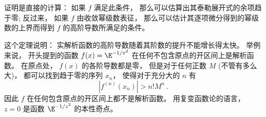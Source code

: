 证明是直接的计算： 如果 $f$ 满足此条件， 那么可以估算出其泰勒展开式的余项趋于零; 反过来， 如果 $f$ 由收敛幂级数表征， 那么可以估计其逐项微分得到的幂级数的上界而得到 $f$ 的高阶导数所满足的条件。

这个定理说明： 实解析函数的高阶导数随着其阶数的提升不能增长得太快。 举例来说， 开头提到的函数 $f(x)=\E^{-1/x^2}$ 在任何不包含原点的开区间上是解析函数。 在原点处， $f(x)$ 的各阶导数都是零， 但是对于任何正数 $M$ (不管有多么大)， 都可以找到趋于零的序列 $x_n$， 使得对于充分大的 $n$ 有
$$
|f^{(n)}(x_n)|>n!M^n~.
$$
因此 $f$ 在任何包含原点的开区间上都不是解析函数。 用复变函数论的语言， $z=0$ 是函数 $\E^{-1/z^2}$ 的本性奇点。
